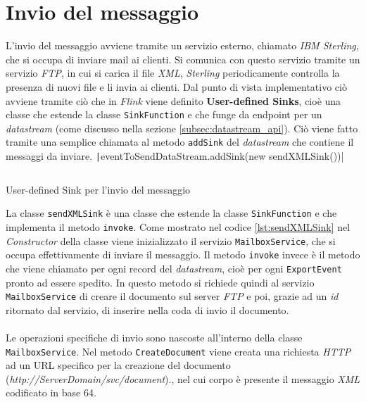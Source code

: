 \section{Invio del messaggio}
\label{sec:InvioDelMessaggio}
L'invio del messaggio avviene tramite un servizio esterno, chiamato \textit{IBM Sterling}, che si occupa di inviare mail ai clienti.
Si comunica con questo servizio tramite un servizio \textit{FTP}, in cui si carica il file \textit{XML},
\textit{Sterling} periodicamente controlla la presenza di nuovi file e li invia ai clienti.
Dal punto di vista implementativo ciò avviene tramite ciò che in \textit{Flink} viene definito \textbf{User-defined Sinks},
cioè una classe che estende la classe \texttt{SinkFunction} e che funge da endpoint per un \textit{datastream} (come discusso nella sezione \ref{subsec:datastream_api}).
Ciò viene fatto tramite una semplice chiamata al metodo \texttt{addSink} del \textit{datastream} che contiene il messaggi da inviare.
\texttt|eventToSendDataStream.addSink(new sendXMLSink())|
\begin{absolutelynopagebreak}
\begin{code}
    \inputminted[linenos,fontsize=\footnotesize]{java}{listings/EventsExport/sendXMLSink.java}
    \caption{User-defined Sink per l'invio del messaggio}
    \label{lst:sendXMLSink}
\end{code}
\end{absolutelynopagebreak}
La classe \texttt{sendXMLSink} è una classe che estende la classe \texttt{SinkFunction} e che implementa il metodo \texttt{invoke}.
Come mostrato nel codice \ref{lst:sendXMLSink} nel \textit{Constructor} della classe viene inizializzato il servizio \texttt{MailboxService},
che si occupa effettivamente di inviare il messaggio.
Il metodo \texttt{invoke} invece è il metodo che viene chiamato per ogni record del \textit{datastream},
cioè per ogni \texttt{ExportEvent} pronto ad essere spedito.
In questo metodo si richiede quindi al servizio \texttt{MailboxService} di creare il documento sul server \textit{FTP} e poi,
grazie ad un \textit{id} ritornato dal servizio, di inserire nella coda di invio il documento.\\\\
Le operazioni specifiche di invio sono nascoste all'interno della classe \texttt{MailboxService}.
Nel metodo \texttt{CreateDocument} viene creata una richiesta \textit{HTTP} ad un URL specifico per la creazione del documento (\textit{http://ServerDomain/svc/document}).,
nel cui corpo è presente il messaggio \textit{XML} codificato in base 64.
